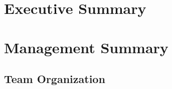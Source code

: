 \documentclass[report]{byu-aero}
\begin{document}


\setcounter{page}{2} %
\thispagestyle{tocpage} %
\tableofcontents %

\clearpage
\newpage

\section{Executive Summary} %
\label{sec:ExecutiveSummary}


\lipsum[1-7]

\newpage

\section{Management Summary} %
\label{sec:ManagementSummary}


\subsection{Team Organization}
\label{ssec:TeamOrganization}
\end{document}
